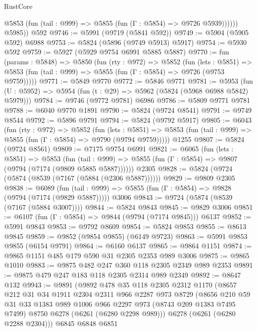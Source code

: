 \begin{lexlean}{RustCore}
\begin{coremodule}
              @5853 (fun (tail : @999) => @5855 (fun (Γ : @5854) => @9726 @5939))))))
        @5985))
    @592
@9746 := @5991 (@9719 (@5841 @592))
@9749 := @5904 (@5905 @592) @6988
@9753 := @5824 (@5896 (@9749 @5913) @5917)
@9754 := @5930 @592
@9759 := @5927 (@5929 @9754 @6991 @5885 @5887)
@9770 := fun (params : @5848) =>
  @5850
    (fun (rty : @972) =>
    @5852
      (fun (lets : @5851) =>
      @5853 (fun (tail : @999) => @5855 (fun (Γ : @5854) => @9726 (@9753 @9759)))))
@9771 := @5849 @9770
@9772 := @5846 @9771
@9781 := @5953 (fun (U : @5952) => @5954 (fun (t : @29) => @5962 (@5824 (@5968 @6988 @5842) @5979)))
@9784 := @9746 (@9772 @9781) @6986
@9786 := @5809 @9771 @9781
@9788 := @6040 @9770 @1891
@9790 := @5824 (@9724 @8541)
@9791 := @9749 @8544
@9792 := @5896 @9791
@9794 := @5824 (@9792 @5917)
@9805 := @6043
    (fun (rty : @972) =>
    @5852
      (fun (lets : @5851) =>
      @5853 (fun (tail : @999) => @5855 (fun (Γ : @5854) => @9790 (@9794 @9759)))))
    @1255
@9807 := @5824 (@9724 @8561)
@9809 := @7175 @9754 @6991
@9821 := @6065
    (fun (lets : @5851) =>
    @5853
      (fun (tail : @999) => @5855 (fun (Γ : @5854) => @9807 (@9794 (@7174 (@9809 @5885 @5887))))))
    @2305
@9828 := @5824 (@9724 (@5874 (@8539 (@7167 (@5884 (@2306 @5887))))))
@9829 := @9809 @2305
@9838 := @6089
    (fun (tail : @999) => @5855 (fun (Γ : @5854) => @9828 (@9794 (@7174 (@9829 @5887)))))
    @3006
@9843 := @9724 (@5874 (@8539 (@7167 (@5884 @3007))))
@9844 := @5824 @9843
@9845 := @9829 @3006
@9851 := @6107 (fun (Γ : @5854) => @9844 (@9794 (@7174 @9845))) @6137
@9852 := @5991 @9843
@9853 := @9792 @8609
@9854 := @5824 @9853
@9855 := @8613 @9845
@9859 := @9852 (@9854 @9855) (@6149 @9723)
@9863 := @5991 @9853 @9855 (@6154 @9791)
@9864 := @6160 @6137
@9865 := @9864 @1151
@9874 := @9865 @1151 @485 @179 @590 @31 @2305 @2353 @989 @3006
@9875 := @9865 @1010
@9883 := @9875 @482 @247 @360 @118 @2305 @2349 @989 @2353
@9891 := @9875 @479 @247 @183 @118 @2305 @2314 @989 @2349
@9892 := @8647 @132
@9943 := @9891
    (@9892
      @478
      @35
      @118
      @2305
      @2312
      @1170
      (@8657
        @212
        @31
        @34
        @1911
        @2304
        @2311
        @966
        @2287
        @973
        @8729
        (@8656
          @210
          @59
          @31
          @33
          @1383
          @989
          @1006
          @966
          @2297
          @973
          (@8743 @209 @1383 @7495 @7499)
          @8750
          @6278
          (@6261 (@6280 @2298 @989)))
        @6278
        (@6261 (@6280 @2288 @2304)))
      @6845
      @6848
      @6851

\end{coremodule}
\end{lexlean}
